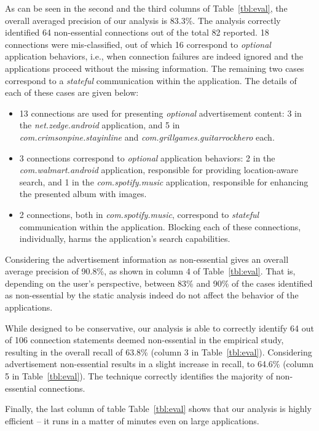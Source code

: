 As can be seen in the second and the third columns of Table~\ref{tbl:eval}, the overall averaged precision of our analysis is 83.3\%. 
The analysis correctly identified 64 non-essential connections out of the total 82 reported. 
18 connections were mis-classified, out of which 16 correspond to \emph{optional} application behaviors, i.e.,
when connection failures are indeed ignored and the applications proceed without the missing information. The 
remaining two cases correspond to a \emph{stateful} communication within the application. 
The details of each of these cases are given below: 

\begin{itemize}[leftmargin=0.5cm]%
\item 13 connections are used for presenting \emph{optional} advertisement content: 
3 in the \emph{net.zedge.android} application, and 
5 in \\
\emph{com.crimsonpine.stayinline} and \emph{com.grillgames.guitarrockhero} each.
\item 3 connections correspond to 
\emph{optional} application behaviors: 2 in the \emph{com.walmart.android} application, responsible for providing location-aware search, and 1 in the \emph{com.spotify.music} application, responsible for enhancing the presented album with images.
\item 2 connections, both in \emph{com.spotify.music}, correspond to \emph{stateful} communication within the application. 
Blocking each of these connections, individually, harms the application's search capabilities.
\end{itemize}

Considering the advertisement information as non-essential gives an overall average precision of 90.8\%, as shown in column 4 of Table~\ref{tbl:eval}. 
That is, depending on the user's perspective, 
between 83\% and 90\% of the cases identified as non-essential by the static analysis indeed do not affect the behavior of the applications. 

While designed to be conservative, our analysis is able to correctly identify 64 out of 106 connection statements deemed non-essential in the empirical study, resulting in the overall recall of 63.8\% (column 3 in Table~\ref{tbl:eval}). Considering advertisement non-essential results in a slight increase in recall, to 64.6\% (column 5 in Table~\ref{tbl:eval}).
The technique correctly identifies the majority of non-essential connections.

Finally, the last column of table Table~\ref{tbl:eval} shows that our analysis is highly efficient -- it runs in a matter of minutes even on large applications. 

